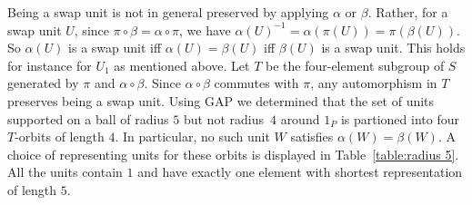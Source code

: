 \documentclass[11pt]{amsart}
\theoremstyle{mythm}
\theoremstyle{mydef}
\theoremstyle{myrem}
\numberwithin{equation}{section}
\begin{document}
  Being a  swap unit is not in general preserved by applying $\alpha$ or $\beta$. Rather, for a swap unit $U$, since $\pi \circ \beta= \alpha \circ \pi$, we have $\alpha(U)^{-1}= \alpha(\pi(U))= \pi (\beta(U))$. So   $\alpha(U)$ is a swap unit iff  $\alpha(U)= \beta(U)$ iff $\beta(U)$ is a swap unit. This holds for instance for $U_1$ as mentioned above.  Let $T$ be the four-element subgroup of $S$ generated by $\pi$ and $\alpha \circ \beta$. Since $\alpha \circ \beta$ commutes with $\pi$, any automorphism in $T$ preserves being a swap unit. Using GAP we determined that the  set of units supported on a ball of radius $5$ but not   radius~$4$ around $1_P$  is partioned into    four  $T$-orbits of length $4$. In particular, no such unit $W$ satisfies $\alpha(W) = \beta(W)$.  A choice of   representing units for these orbits is displayed in Table~\ref{table:radius 5}. %
All the   units  contain $1$ and   have exactly one element with shortest representation of length $5$. 
 \setlength{\fboxsep}{1pt}
\setlength{\fboxrule}{0.8pt}
\end{document}
